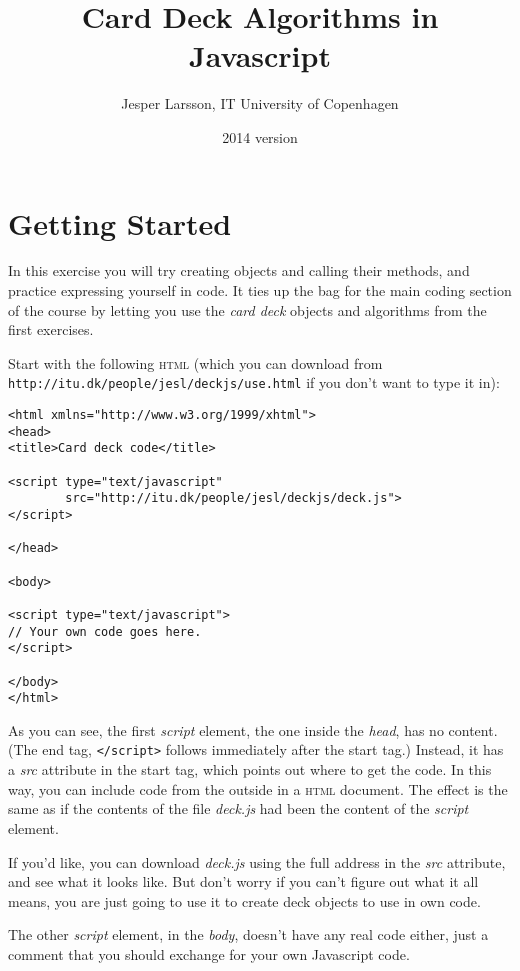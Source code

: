 \documentclass[a4paper,twoside]{tufte-handout}
\title{Card Deck Algorithms in Javascript}
\author{Jesper Larsson, IT University of Copenhagen}
\date{2014 version}
\begin{document}
\maketitle

\section{Getting Started}\label{sec-start}

In this exercise you will try creating objects and calling their
methods, and practice expressing yourself in code. It ties up the bag
for the main coding section of the course by letting you use the \emph{card deck}
objects and algorithms from the first exercises.

Start with the following \textsc{html} (which you can download from
\verb'http://itu.dk/people/jesl/deckjs/use.html' if you
don't want to type it in):
\begin{lstlisting}
<html xmlns="http://www.w3.org/1999/xhtml">
<head>
<title>Card deck code</title>

<script type="text/javascript"
        src="http://itu.dk/people/jesl/deckjs/deck.js">
</script>

</head>

<body>

<script type="text/javascript">
// Your own code goes here.
</script>

</body>
</html>
\end{lstlisting}

As you can see, the first \emph{script} element, the one inside the
\emph{head}, has no content. (The end tag, \verb'</script>' follows
immediately after the start tag.) Instead, it has a \emph{src}
attribute in the start tag, which points out where to get the code. In
this way, you can include code from the outside in a \textsc{html}
document. The effect is the same as if the contents of the file
\emph{deck.js} had been the content of the \emph{script} element.

If you'd like, you can download \emph{deck.js} using the full address
in the \emph{src} attribute, and see what it looks like. But don't
worry if you can't figure out what it all means, you are just going to
use it to create deck objects to use in own code.

The other \emph{script} element, in the \emph{body}, doesn't have any
real code either, just a comment that you should exchange for your own
Javascript code.
\end{document}
